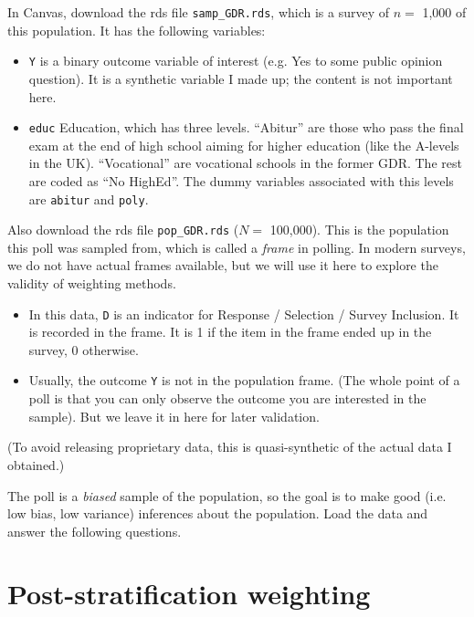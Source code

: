 \documentclass[10pt, letterpaper]{article}
\theoremstyle{mytheoremstyle}
\begin{document}
\vspace{0.2in}


In Canvas, download the rds file \texttt{samp\_GDR.rds}, which is a survey of $n =$ 1,000 of this population. It has the following variables:

\begin{itemize}
\item \texttt{Y} is a binary outcome variable of interest (e.g. Yes to some public opinion question). It is a synthetic variable I made up; the content is not important here. 
\item \texttt{educ} Education, which has three levels. ``Abitur'' are those who pass the final exam at the end of high school aiming for higher education (like the A-levels in the UK). ``Vocational'' are vocational schools in the former GDR. The rest are coded as ``No HighEd''. The dummy variables associated with this levels are \texttt{abitur} and \texttt{poly}.
\end{itemize}

Also download the rds file \texttt{pop\_GDR.rds} ($N=$ 100,000). This is the population this poll was sampled from, which is called a \textit{frame} in polling. In modern surveys, we do not have actual frames available, but we will use it here to explore the validity of weighting methods. 

\begin{itemize}
\item In this data, \texttt{D} is an indicator for Response / Selection / Survey Inclusion. It is recorded in the frame. It is 1 if the item in the frame ended up in the survey, 0 otherwise. 
\item Usually, the outcome \texttt{Y} is not in the population frame. (The whole point of a poll is that you can only observe the outcome you are interested in the sample). But we leave it in here for later validation.
\end{itemize}

(To avoid releasing proprietary data, this is quasi-synthetic of the actual data I obtained.)

\bigskip

The poll is a \emph{biased} sample of the population, so the goal is to make good (i.e. low bias, low variance) inferences about the population.  Load the data and answer the following questions.

\section{Post-stratification weighting}
\end{document}
